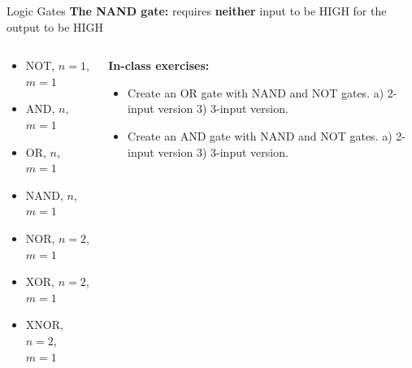 \documentclass{beamer}
\begin{document}
\begin{frame}{Logic Gates}
\textbf{The NAND gate:} requires \textbf{neither} input to be HIGH for the output to be HIGH \\ \vspace{0.5cm}
\begin{columns}[T]
\begin{column}{0.5\textwidth}
\begin{itemize}
\item \alert{NOT, $n=1$, $m=1$}
\item \alert{AND, $n$, $m=1$}
\item \alert{OR, $n$, $m=1$}
\item \alert{NAND, $n$, $m=1$}
\item NOR, $n=2$, $m=1$
\item XOR, $n=2$, $m=1$
\item XNOR, $n=2$, $m=1$
\end{itemize}
\end{column}
\begin{column}{0.5\textwidth}
\small
\textbf{In-class exercises:}
\begin{itemize}
\item Create an OR gate with NAND and NOT gates. a) 2-input version 3) 3-input version.
\item Create an AND gate with NAND and NOT gates. a) 2-input version 3) 3-input version.
\end{itemize}
\end{column}
\end{columns}
\end{frame}
\end{document}
